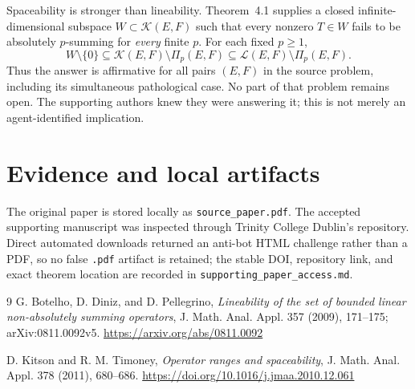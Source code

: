 \documentclass[11pt]{article}
\begin{document}
Spaceability is stronger than lineability. Theorem~4.1 supplies a closed
infinite-dimensional subspace $W\subset\mathcal K(E,F)$ such that every
nonzero $T\in W$ fails to be absolutely $p$-summing for \emph{every} finite
$p$. For each fixed $p\geq1$,
\[
  W\setminus\{0\}
  \subseteq \mathcal K(E,F)\setminus\Pi_p(E,F)
  \subseteq \mathcal L(E,F)\setminus\Pi_p(E,F).
\]
Thus the answer is affirmative for all pairs $(E,F)$ in the source problem,
including its simultaneous pathological case. No part of that problem
remains open. The supporting authors knew they were answering it; this is
not merely an agent-identified implication.

\section*{Evidence and local artifacts}

The original paper is stored locally as \texttt{source\_paper.pdf}. The
accepted supporting manuscript was inspected through Trinity College
Dublin's repository. Direct automated downloads returned an anti-bot HTML
challenge rather than a PDF, so no false \texttt{.pdf} artifact is retained;
the stable DOI, repository link, and exact theorem location are recorded in
\texttt{supporting\_paper\_access.md}.

\begin{thebibliography}{9}
G. Botelho, D. Diniz, and D. Pellegrino,
\emph{Lineability of the set of bounded linear non-absolutely summing
operators}, J. Math. Anal. Appl. 357 (2009), 171--175;
arXiv:0811.0092v5.
\url{https://arxiv.org/abs/0811.0092}

D. Kitson and R. M. Timoney,
\emph{Operator ranges and spaceability},
J. Math. Anal. Appl. 378 (2011), 680--686.
\url{https://doi.org/10.1016/j.jmaa.2010.12.061}
\end{thebibliography}
\end{document}
